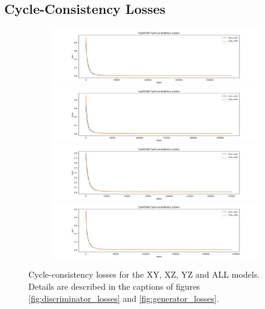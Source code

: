 \documentclass[11pt, fleqn, titlepage]{article}
\newcommand{\1}[1]{\mathds{1}\left[#1\right]}
\begin{document}
\subsection{Cycle-Consistency Losses}\label{cycle_loss}
\begin{figure}[H]
	\centering
	\begin{subfigure}[b]{0.8\textwidth}
		\centering
		\includegraphics[width=\linewidth]{imgs/cycle_losses/XY_model_cycle_losses}
		\hfill
		\includegraphics[width=\linewidth]{imgs/cycle_losses/XZ_model_cycle_losses}
		\hfill
		\includegraphics[width=\linewidth]{imgs/cycle_losses/YZ_model_cycle_losses}
		\hfill
		\includegraphics[width=\linewidth]{imgs/cycle_losses/ALL_model_cycle_losses}
	\end{subfigure}
	\caption{Cycle-consistency losses for the XY, XZ, YZ and ALL models. Details are described in the captions of figures \ref{fig:discriminator_losses} and \ref{fig:generator_losses}.}
	\label{fig:cycle_losses}
\end{figure}
\end{document}
